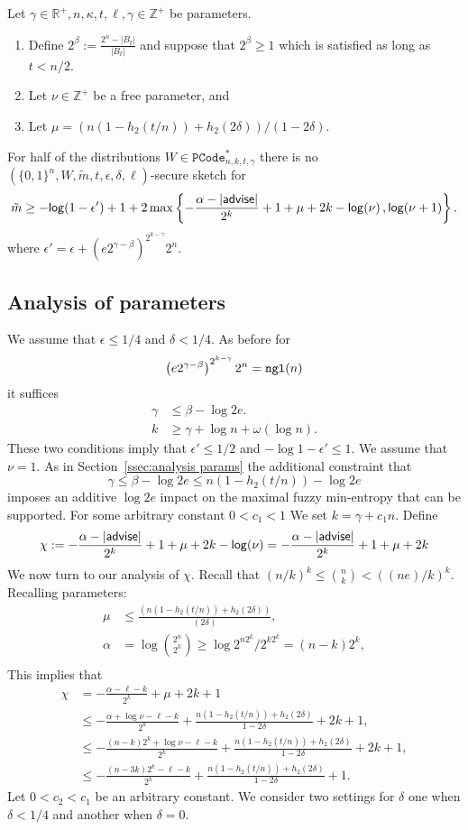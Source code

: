 \begin{theorem}
Let $\gamma \in\mathbb{R}^+, n, \kappa, t, \ell, \gamma \in\mathbb{Z}^+$ be parameters.
\begin{enumerate}
\itemsep0em
\item Define $2^\beta:=\frac{2^n-|B_t|}{|B_t|}$ and suppose that $2^\beta\ge 1$ which is satisfied as long as $t< n/2 $. 
\item Let $\nu \in \mathbb{Z}^+$ be a free parameter, and
\item Let $\mu =(n(1-h_2(t/n)) +h_2(2\delta))/(1-2\delta)$.
\end{enumerate}
For half of the distributions $W\in \mathtt{PCode}_{n, k, t, \gamma}^{*}$ there is no $(\{0,1\}^n, W, \tilde{m}, t, \epsilon,\delta, \ell)$-secure sketch for 
\[
\tilde{m}\ge  -\mathsf{log}\!\left(1-\epsilon'\right) +1 + 2\max\left\{-\frac{\alpha-|{\mathsf{advise}}|}{2^k}+1+\mu+2k-\mathsf{log}\!\left(\nu\right), \mathsf{log}\!\left(\nu+1\right)\right\}.
\]
where $\epsilon' = \epsilon+\left(e2^{\gamma-\beta}\right)^{2^{k-\gamma}}2^n.$
\label{thm:main theorem ss}
\end{theorem}

\subsection{Analysis of parameters}
We assume that $\epsilon\le 1/4$ and $\delta<1/4$.  As before for  
\[
\left(e2^{\gamma-\beta}\right)^{2^{k-\gamma}}2^n = \mathtt{ngl}(n)\]  it suffices 
\begin{align*}
 \gamma &\le \beta -\log{2e}.\\
k &\ge \gamma + \log{n+ \omega(\log{n})}.
\end{align*}
These two conditions imply that $\epsilon'\le 1/2$ and $-\log{1-\epsilon'}\le 1$.
We assume that $\nu = 1$.
As in Section~\ref{ssec:analysis params} the additional constraint that 
\[
\gamma \le \beta - \log{2e}
\le n(1-h_2(t/n)) - \log{2e}\] imposes an additive $\log{2e}$ impact on the maximal fuzzy min-entropy that can be supported. 
For some arbitrary constant $0<c_1 < 1$ We set $k = \gamma + c_1n$. 
Define \[\chi: =-\frac{\alpha-|{\mathsf{advise}}|}{2^k}+1+\mu+2k-\mathsf{log}\!\left(\nu\right)=-\frac{\alpha-|{\mathsf{advise}}|}{2^k}+1+\mu+2k\]
We now turn to our analysis of $\chi$.  Recall that $(n/k)^k \le {n\choose k} < ((ne)/k)^k$.  Recalling parameters: 
\begin{align*}
\mu&\le \frac{(n(1-h_2(t/n)) +h_2(2\delta))}{(2\delta)},\\
\alpha &= \log{2^n\choose 2^k} \ge \log{2^{n2^k} /2^{k2^k}} = (n-k)2^k,\\
\end{align*}
This implies that 
\begin{align*}
\chi&= -\frac{\alpha-\ell-k}{2^k} + \mu +2k+1\\
&\le  -\frac{\alpha +\log{\nu}-\ell-k}{2^k} +\frac{n(1-h_2(t/n)) +h_2(2\delta)}{1-2\delta}  + 2k+1,\\
&\le - \frac{(n-k)2^k +\log{\nu}-\ell-k}{2^k} +\frac{n(1-h_2(t/n)) +h_2(2\delta)}{1-2\delta} + 2k+1,\\
&\le  -\frac{(n-3k)2^k-\ell-k}{2^k} + \frac{n(1-h_2(t/n)) +h_2(2\delta)}{1-2\delta}+1.
\end{align*}
Let $0<c_2<c_1$ be an arbitrary constant. We consider two settings for $\delta$ one when $\delta<1/4$ and another when $\delta=0$.

